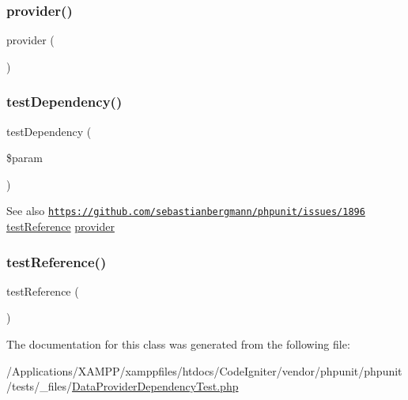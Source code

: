 \subsubsection{\texorpdfstring{provider()}{provider()}}
{\footnotesize\ttfamily provider (\begin{DoxyParamCaption}{ }\end{DoxyParamCaption})}

\mbox{\label{class_data_provider_dependency_test_ad6e80c77f7710ad021537a504bc76020}} 
\subsubsection{\texorpdfstring{test\+Dependency()}{testDependency()}}
{\footnotesize\ttfamily test\+Dependency (\begin{DoxyParamCaption}\item[{}]{\$param }\end{DoxyParamCaption})}

\begin{DoxySeeAlso}{See also}
\href{https://github.com/sebastianbergmann/phpunit/issues/1896}{\tt https\+://github.\+com/sebastianbergmann/phpunit/issues/1896}  \mbox{\hyperlink{class_data_provider_dependency_test_a45b17112a04e0fb2b4522ce8bf221b97}{test\+Reference}}  \mbox{\hyperlink{class_data_provider_dependency_test_a141540808e5970d27589425027e66cc9}{provider}} 
\end{DoxySeeAlso}
\mbox{\label{class_data_provider_dependency_test_a45b17112a04e0fb2b4522ce8bf221b97}} 
\subsubsection{\texorpdfstring{test\+Reference()}{testReference()}}
{\footnotesize\ttfamily test\+Reference (\begin{DoxyParamCaption}{ }\end{DoxyParamCaption})}



The documentation for this class was generated from the following file\+:\begin{DoxyCompactItemize}
\item 
/\+Applications/\+X\+A\+M\+P\+P/xamppfiles/htdocs/\+Code\+Igniter/vendor/phpunit/phpunit/tests/\+\_\+files/\mbox{\hyperlink{_data_provider_dependency_test_8php}{Data\+Provider\+Dependency\+Test.\+php}}\end{DoxyCompactItemize}
